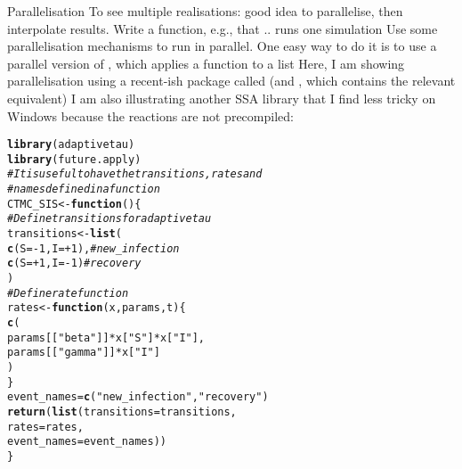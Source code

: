 \documentclass[aspectratio=169]{beamer}\usepackage[]{graphicx}\usepackage[]{xcolor}
\makeatletter
\newcommand{\hlnum}[1]{\textcolor[rgb]{0.686,0.059,0.569}{#1}}%
\newcommand{\hlsng}[1]{\textcolor[rgb]{0.192,0.494,0.8}{#1}}%
\newcommand{\hlcom}[1]{\textcolor[rgb]{0.678,0.584,0.686}{\textit{#1}}}%
\newcommand{\hlopt}[1]{\textcolor[rgb]{0,0,0}{#1}}%
\newcommand{\hldef}[1]{\textcolor[rgb]{0.345,0.345,0.345}{#1}}%
\newcommand{\hlkwa}[1]{\textcolor[rgb]{0.161,0.373,0.58}{\textbf{#1}}}%
\newcommand{\hlkwb}[1]{\textcolor[rgb]{0.69,0.353,0.396}{#1}}%
\newcommand{\hlkwc}[1]{\textcolor[rgb]{0.333,0.667,0.333}{#1}}%
\newcommand{\hlkwd}[1]{\textcolor[rgb]{0.737,0.353,0.396}{\textbf{#1}}}%
\newenvironment{kframe}{%
 \def\at@end@of@kframe{}%
 \ifinner\ifhmode%
  \def\at@end@of@kframe{\end{minipage}}%
  \begin{minipage}{\columnwidth}%
 \fi\fi%
 \def\FrameCommand##1{\hskip\@totalleftmargin \hskip-\fboxsep
 \colorbox{shadecolor}{##1}\hskip-\fboxsep
     \hskip-\linewidth \hskip-\@totalleftmargin \hskip\columnwidth}%
 \MakeFramed {\advance\hsize-\width
   \@totalleftmargin\z@ \linewidth\hsize
   \@setminipage}}%
 {\par\unskip\endMakeFramed%
 \at@end@of@kframe}
\newenvironment{knitrout}{}{} %
\makeatother
\begin{document}
\begin{frame}{Parallelisation}
    To see multiple realisations: good idea to parallelise, then interpolate results. Write a function, e.g.,   that .. runs one simulation
    \vfill
    Use some parallelisation mechanisms to run  in parallel. One easy way to do it is to use a parallel version of , which applies a function to a list
    \vfill
    Here, I am showing parallelisation using a recent-ish package called  (and , which contains the relevant  equivalent)
    \vfill
    I am also illustrating another SSA library that I find less tricky on Windows because the reactions are not precompiled: 
\end{frame}

\begin{knitrout}
\color{fgcolor}\begin{kframe}
\begin{alltt}
\hlkwd{library}\hldef{(adaptivetau)}
\hlkwd{library}\hldef{(future.apply)}
\hlcom{# It is useful to have the transitions, rates and }
\hlcom{# names defined in a function}
\hldef{CTMC_SIS} \hlkwb{<-} \hlkwa{function}\hldef{() \{}
  \hlcom{# Define transitions for adaptivetau}
  \hldef{transitions} \hlkwb{<-} \hlkwd{list}\hldef{(}
    \hlkwd{c}\hldef{(}\hlkwc{S} \hldef{=} \hlopt{-}\hlnum{1}\hldef{,} \hlkwc{I} \hldef{=} \hlopt{+}\hlnum{1}\hldef{),}  \hlcom{# new_infection}
    \hlkwd{c}\hldef{(}\hlkwc{S} \hldef{=} \hlopt{+}\hlnum{1}\hldef{,} \hlkwc{I} \hldef{=} \hlopt{-}\hlnum{1}\hldef{)}   \hlcom{# recovery}
  \hldef{)}
  \hlcom{# Define rate function}
  \hldef{rates} \hlkwb{<-} \hlkwa{function}\hldef{(}\hlkwc{x}\hldef{,} \hlkwc{params}\hldef{,} \hlkwc{t}\hldef{) \{}
    \hlkwd{c}\hldef{(}
      \hldef{params[[}\hlsng{"beta"}\hldef{]]} \hlopt{*} \hldef{x[}\hlsng{"S"}\hldef{]} \hlopt{*} \hldef{x[}\hlsng{"I"}\hldef{],}
      \hldef{params[[}\hlsng{"gamma"}\hldef{]]} \hlopt{*} \hldef{x[}\hlsng{"I"}\hldef{]}
    \hldef{)}
  \hldef{\}}
  \hldef{event_names} \hlkwb{=} \hlkwd{c}\hldef{(}\hlsng{"new_infection"}\hldef{,} \hlsng{"recovery"}\hldef{)}
  \hlkwd{return}\hldef{(}\hlkwd{list}\hldef{(}\hlkwc{transitions} \hldef{= transitions,}
              \hlkwc{rates} \hldef{= rates,}
              \hlkwc{event_names} \hldef{= event_names))}
\hldef{\}}


\end{alltt}
\end{kframe}
\end{knitrout}
\end{document}

